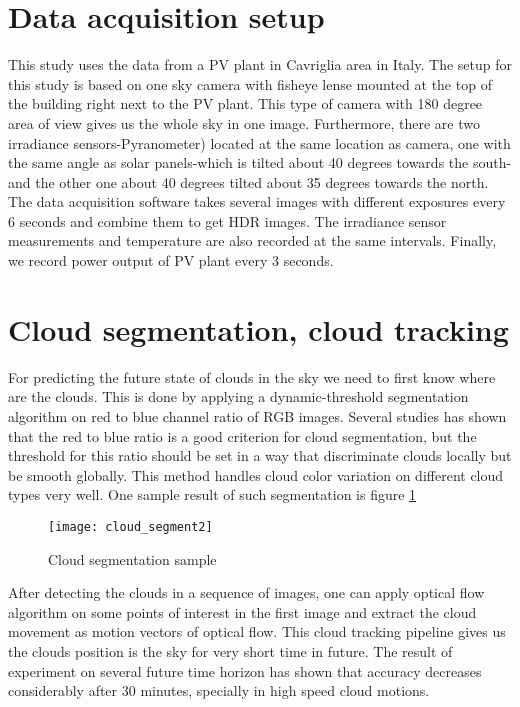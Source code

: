 \section{Data acquisition setup}
This study uses the data from a PV plant in Cavriglia area in Italy.
The setup for this study is based on one sky camera with fisheye lense mounted at the top of the building right next to the PV plant. This type of camera with 180 degree area of view gives us the whole sky in one image. Furthermore, there are two irradiance sensors-Pyranometer) located at the same location as camera, one with the same angle as solar panels-which is tilted about 40 degrees towards the south- and the other one about 40 degrees tilted about 35 degrees towards the north. The data acquisition software takes several images with different exposures every 6 seconds and combine them to get HDR images. The irradiance sensor measurements and temperature are also recorded at the same intervals. Finally, we record power output of PV plant every 3 seconds.

\section{Cloud segmentation, cloud tracking}
For predicting the future state of clouds in the sky we need to first know where are the clouds. This is done by applying a dynamic-threshold segmentation algorithm on red to blue channel ratio of RGB images. Several studies has shown that the red to blue ratio is a good criterion for cloud segmentation, but the threshold for this ratio should be set in a way that discriminate clouds locally but be smooth globally. This method handles cloud color variation on different cloud types very well. One sample result of such segmentation is figure \ref{fig:cloud_seg}
\begin{figure}[h]
\caption{Cloud segmentation sample}
\label{fig:cloud_seg}
\texttt{[image: cloud\_segment2]}
\centering
\end{figure}

After detecting the clouds in a sequence of images, one can apply optical flow algorithm on some points of interest in the first image and extract the cloud movement as motion vectors of optical flow. This cloud tracking pipeline gives us the clouds position is the sky for very short time in future. The result of experiment on several future time horizon has shown that accuracy decreases considerably after 30 minutes, specially in high speed cloud motions.

